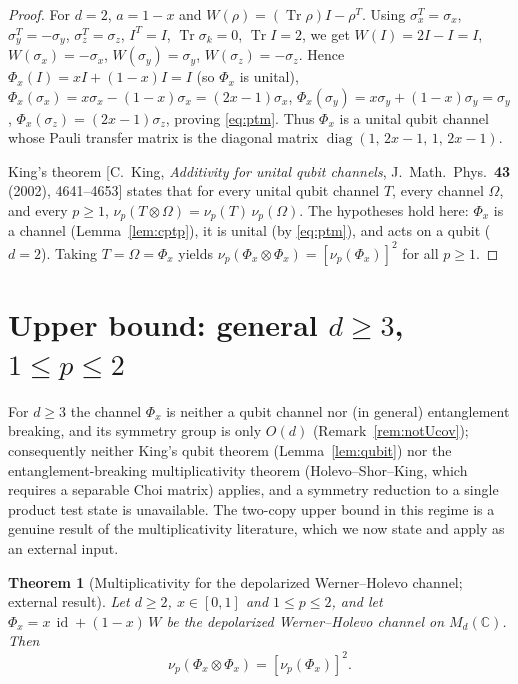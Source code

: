 \documentclass{amsart}
\newtheorem{theorem}{Theorem}
\theoremstyle{definition}
\DeclareMathOperator{\Tr}{Tr}
\DeclareMathOperator{\id}{id}
\begin{document}
\begin{proof}
For $d=2$, $a=1-x$ and $W(\rho)=(\Tr\rho)I-\rho^{T}$. Using
$\sigma_x^{T}=\sigma_x$, $\sigma_y^{T}=-\sigma_y$, $\sigma_z^{T}=\sigma_z$,
$I^{T}=I$, $\Tr\sigma_k=0$, $\Tr I=2$, we get $W(I)=2I-I=I$,
$W(\sigma_x)=-\sigma_x$, $W(\sigma_y)=\sigma_y$, $W(\sigma_z)=-\sigma_z$. Hence
$\Phi_x(I)=xI+(1-x)I=I$ (so $\Phi_x$ is unital),
$\Phi_x(\sigma_x)=x\sigma_x-(1-x)\sigma_x=(2x-1)\sigma_x$,
$\Phi_x(\sigma_y)=x\sigma_y+(1-x)\sigma_y=\sigma_y$,
$\Phi_x(\sigma_z)=(2x-1)\sigma_z$, proving \eqref{eq:ptm}. Thus $\Phi_x$ is a
unital qubit channel whose Pauli transfer matrix is the diagonal matrix
$\operatorname{diag}(1,\,2x-1,\,1,\,2x-1)$.

King's theorem [C.~King, \emph{Additivity for unital qubit channels},
J.~Math.\ Phys.\ \textbf{43} (2002), 4641--4653] states that for every unital
qubit channel $T$, every channel $\Omega$, and every $p\ge1$,
$\nu_p(T\otimes\Omega)=\nu_p(T)\,\nu_p(\Omega)$. The hypotheses hold here:
$\Phi_x$ is a channel (Lemma~\ref{lem:cptp}), it is unital (by \eqref{eq:ptm}),
and acts on a qubit ($d=2$). Taking $T=\Omega=\Phi_x$ yields
$\nu_p(\Phi_x\otimes\Phi_x)=[\nu_p(\Phi_x)]^{2}$ for all $p\ge1$.
\end{proof}

\section{Upper bound: general $d\ge3$, $1\le p\le2$}
\label{sec:general}

For $d\ge3$ the channel $\Phi_x$ is neither a qubit channel nor (in general)
entanglement breaking, and its symmetry group is only $O(d)$
(Remark~\ref{rem:notUcov}); consequently neither King's qubit theorem
(Lemma~\ref{lem:qubit}) nor the entanglement-breaking multiplicativity theorem
(Holevo--Shor--King, which requires a separable Choi matrix) applies, and a
symmetry reduction to a single product test state is unavailable. The two-copy
upper bound in this regime is a genuine result of the multiplicativity
literature, which we now state and apply as an external input.

\begin{theorem}[Multiplicativity for the depolarized Werner--Holevo channel;
external result]\label{thm:knr}
Let $d\ge2$, $x\in[0,1]$ and $1\le p\le2$, and let
$\Phi_x=x\,\id+(1-x)\,W$ be the depolarized Werner--Holevo channel on
$M_d(\mathbb C)$. Then
\[
\nu_p(\Phi_x\otimes\Phi_x)=[\nu_p(\Phi_x)]^{2}.
\]
\end{theorem}
\end{document}
